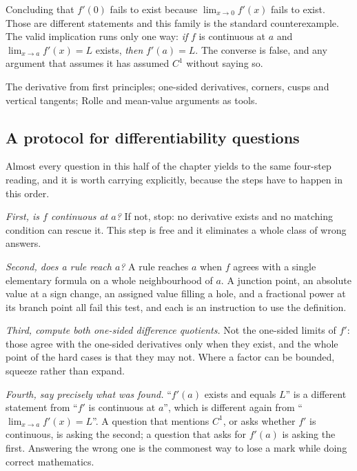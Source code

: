 \begin{trap}
Concluding that $f'(0)$ fails to exist because $\lim_{x\to0}f'(x)$ fails to exist. Those are different statements and this family is the standard counterexample. The valid implication runs only one way: \emph{if} $f$ is continuous at $a$ and $\lim_{x\to a}f'(x)=L$ exists, \emph{then} $f'(a)=L$. The converse is false, and any argument that assumes it has assumed $C^{1}$ without saying so.
\end{trap}

\begin{seealsob}The derivative from first principles; one-sided derivatives, corners, cusps and vertical tangents; Rolle and mean-value arguments as tools.\end{seealsob}

\subsection{A protocol for differentiability questions}

Almost every question in this half of the chapter yields to the same four-step reading, and it is worth carrying explicitly, because the steps have to happen in this order.

\emph{First, is $f$ continuous at $a$?} If not, stop: no derivative exists and no matching condition can rescue it. This step is free and it eliminates a whole class of wrong answers.

\emph{Second, does a rule reach $a$?} A rule reaches $a$ when $f$ agrees with a single elementary formula on a whole neighbourhood of $a$. A junction point, an absolute value at a sign change, an assigned value filling a hole, and a fractional power at its branch point all fail this test, and each is an instruction to use the definition.

\emph{Third, compute both one-sided difference quotients.} Not the one-sided limits of $f'$: those agree with the one-sided derivatives only when they exist, and the whole point of the hard cases is that they may not. Where a factor can be bounded, squeeze rather than expand.

\emph{Fourth, say precisely what was found.} ``$f'(a)$ exists and equals $L$'' is a different statement from ``$f'$ is continuous at $a$'', which is different again from ``$\lim_{x\to a}f'(x)=L$''. A question that mentions $C^{1}$, or asks whether $f'$ is continuous, is asking the second; a question that asks for $f'(a)$ is asking the first. Answering the wrong one is the commonest way to lose a mark while doing correct mathematics.

